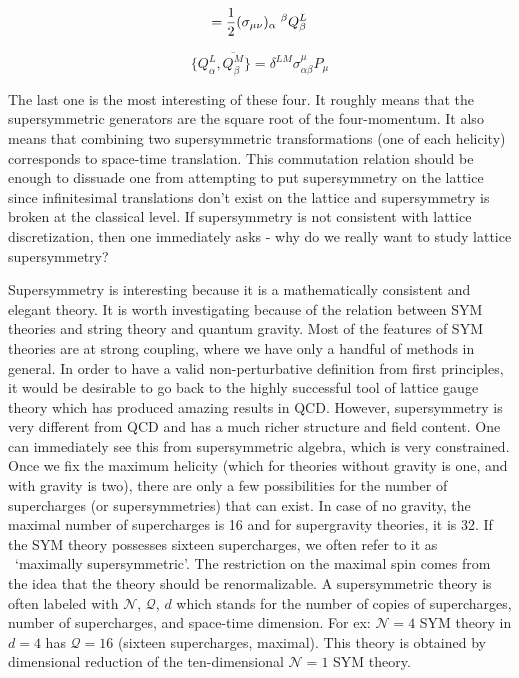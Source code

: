 \begin{equation} 
[Q_{\alpha}^{L}, M_{\mu\nu}]  = \frac{1}{2} (\sigma_{\mu\nu})_{\alpha} \hspace{1mm} ^ {\beta} Q_{\beta}^{L} 
 \end{equation} 

\begin{equation} 
 \{Q_{\alpha}^{L}, \overline{Q_{\beta}^{M}}\} = \delta^{LM} \sigma^{\mu}_{\alpha\beta} P_{\mu}
  \end{equation} 

The last one is the most interesting of these four. It roughly means that the supersymmetric generators are
the square root of the four-momentum. It also means that combining two supersymmetric transformations 
(one of each helicity) corresponds to space-time translation. 
This commutation relation should be enough to dissuade one from attempting to put supersymmetry on the lattice since 
infinitesimal translations don't exist on the lattice and supersymmetry is broken at the classical level. If supersymmetry is 
not consistent with lattice discretization, then one immediately asks - why do we really want to study lattice supersymmetry? 

Supersymmetry is interesting because it is a mathematically consistent and elegant theory. It is worth investigating because
of the relation between SYM theories and string theory and quantum gravity. 
Most of the features of SYM theories are at strong coupling, where we have only a handful of methods in general. 
In order to have a valid non-perturbative definition from first principles, it would be desirable to go back to the highly 
successful tool of lattice gauge theory which has produced amazing results in QCD. 
However, supersymmetry is very different from QCD and has a much richer structure and field content. 
One can immediately see this from supersymmetric algebra, which is very constrained. 
Once we fix the maximum helicity (which for theories without gravity is one, and with gravity is two), 
there are only a few possibilities for the number of supercharges (or supersymmetries) that can exist. In case of no gravity, 
the maximal number of supercharges is 
16 and for supergravity theories, it is 32. If the SYM theory possesses sixteen supercharges, 
we often refer to it as ~`maximally supersymmetric'.
The restriction on the maximal spin comes from the idea that the theory should be renormalizable.
A supersymmetric theory is often labeled with $\mathcal{N}$, $\mathcal{Q}$, $d$  which stands for the 
number of copies of supercharges, number of supercharges, and space-time dimension. 
For ex: $\mathcal{N}=4$ SYM theory in $d=4$ has $\mathcal{Q}=16$ (sixteen supercharges, maximal).
This theory is obtained by dimensional reduction of the ten-dimensional $\mathcal{N}=1$ SYM theory. 

